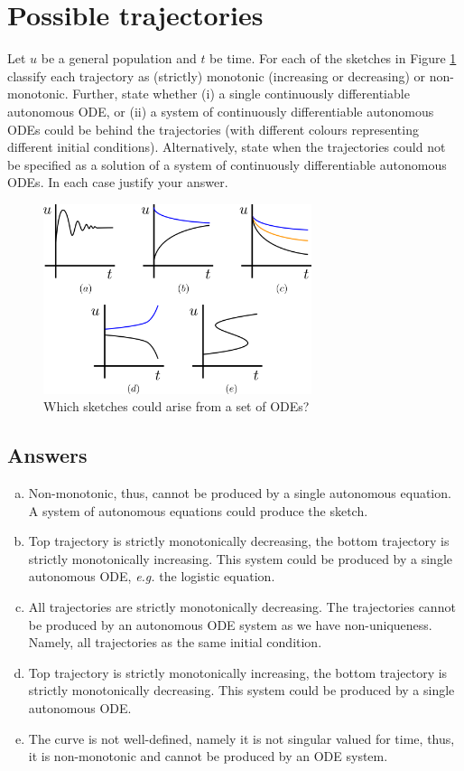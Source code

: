\documentclass[10pt]{article}
\newcommand{\fig}[1]{Figure \ref{#1}}
\newcommand{\eg}{\emph{e.g.} }
\begin{document}
\section{Possible trajectories}
Let $u$ be a general population and $t$ be time. For each of the sketches in \fig{Possible_trajectories} classify each trajectory as (strictly) monotonic (increasing or decreasing) or non-monotonic. Further, state whether (i) a single continuously differentiable autonomous ODE, or (ii) a system of continuously differentiable autonomous ODEs could be behind the trajectories (with different colours representing different initial conditions). Alternatively, state when the trajectories could not be specified as a solution of a system of continuously differentiable autonomous ODEs. In each case justify your answer.
\begin{figure}[h!!!tb]
\centering
\includegraphics[width=0.7\textwidth]{../../Pictures/Possible_trajectories.png}
\caption{\label{Possible_trajectories} Which sketches could arise from a set of ODEs?}
\end{figure}
\begin{Answ}
\subsection{Answers}
\begin{enumerate}[(a)]
\item Non-monotonic, thus, cannot be produced by a single autonomous equation. A system of autonomous equations could produce the sketch.
\item Top trajectory is strictly monotonically decreasing, the bottom trajectory is strictly monotonically increasing. This system could be produced by a single autonomous ODE, \eg the logistic equation.
\item All trajectories are strictly monotonically decreasing. The trajectories cannot be produced by an autonomous ODE system as we have non-uniqueness. Namely, all trajectories as the same initial condition.
\item Top trajectory is strictly monotonically increasing, the bottom trajectory is strictly monotonically decreasing. This system could be produced by a single autonomous ODE.
\item The curve is not well-defined, namely it is not singular valued for time, thus, it is non-monotonic and cannot be produced by an ODE system.
\end{enumerate}
\end{Answ}
\end{document}
